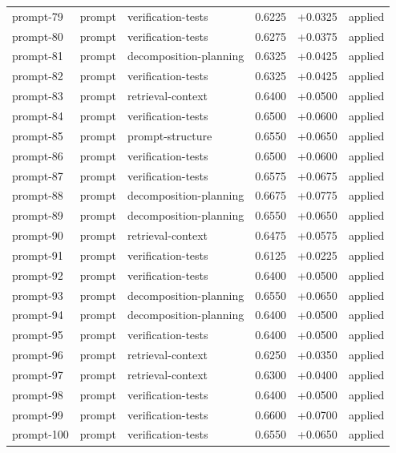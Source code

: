 \begin{center}
\begin{longtable}{llp{5.2cm}rrl}
prompt-79 & prompt & verification-tests & 0.6225 & +0.0325 & applied \\
prompt-80 & prompt & verification-tests & 0.6275 & +0.0375 & applied \\
prompt-81 & prompt & decomposition-planning & 0.6325 & +0.0425 & applied \\
prompt-82 & prompt & verification-tests & 0.6325 & +0.0425 & applied \\
prompt-83 & prompt & retrieval-context & 0.6400 & +0.0500 & applied \\
prompt-84 & prompt & verification-tests & 0.6500 & +0.0600 & applied \\
prompt-85 & prompt & prompt-structure & 0.6550 & +0.0650 & applied \\
prompt-86 & prompt & verification-tests & 0.6500 & +0.0600 & applied \\
prompt-87 & prompt & verification-tests & 0.6575 & +0.0675 & applied \\
prompt-88 & prompt & decomposition-planning & 0.6675 & +0.0775 & applied \\
prompt-89 & prompt & decomposition-planning & 0.6550 & +0.0650 & applied \\
prompt-90 & prompt & retrieval-context & 0.6475 & +0.0575 & applied \\
prompt-91 & prompt & verification-tests & 0.6125 & +0.0225 & applied \\
prompt-92 & prompt & verification-tests & 0.6400 & +0.0500 & applied \\
prompt-93 & prompt & decomposition-planning & 0.6550 & +0.0650 & applied \\
prompt-94 & prompt & decomposition-planning & 0.6400 & +0.0500 & applied \\
prompt-95 & prompt & verification-tests & 0.6400 & +0.0500 & applied \\
prompt-96 & prompt & retrieval-context & 0.6250 & +0.0350 & applied \\
prompt-97 & prompt & retrieval-context & 0.6300 & +0.0400 & applied \\
prompt-98 & prompt & verification-tests & 0.6400 & +0.0500 & applied \\
prompt-99 & prompt & verification-tests & 0.6600 & +0.0700 & applied \\
prompt-100 & prompt & verification-tests & 0.6550 & +0.0650 & applied \\
\bottomrule\end{longtable}\end{center}
\clearpage

